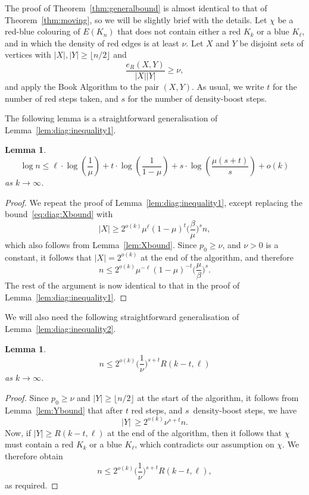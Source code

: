 \documentclass[12pt,reqno]{amsart}
\newtheorem{lemma}[theorem]{Lemma}
\theoremstyle{definition}
\theoremstyle{remark}
\renewcommand{\le}{\leqslant}
\renewcommand{\ge}{\geqslant}
\renewcommand{\to}{\rightarrow}
\begin{document}
The proof of Theorem~\ref{thm:generalbound} is almost identical to that of Theorem~\ref{thm:moving}, so we will be slightly brief with the details. Let $\chi$ be a red-blue colouring of $E(K_n)$ that does not contain either a red $K_k$ or a blue $K_\ell$, and in which the density of red edges is at least $\nu$. Let $X$ and $Y$ be disjoint sets of vertices with $|X|,|Y| \ge \lfloor n/2 \rfloor$ and 
$$\frac{e_R(X,Y)}{|X||Y|} \ge \nu,$$
and apply the Book Algorithm to the pair $(X,Y)$. As usual, we write $t$ for the number of red steps taken, and $s$ for the number of density-boost steps. 
  
The following lemma is a straightforward generalisation of Lemma~\ref{lem:diag:inequality1}.
  
\begin{lemma}\label{lem:offdiag:inequality1}
$$\log n \le \ell \cdot \log \left( \frac{1}{\mu} \right) + t \cdot \log \left(\frac{1}{1-\mu} \right) + s \cdot \log \left(\frac{\mu(s+t)}{s}\right) + o(k)$$
as $k \to \infty$. 
\end{lemma}

\begin{proof}
We repeat the proof of Lemma~\ref{lem:diag:inequality1}, except replacing the bound~\eqref{eq:diag:Xbound} with 
$$|X| \ge 2^{o(k)} \mu^\ell (1 - \mu)^t \bigg( \frac{\beta}{\mu} \bigg)^s n,$$
which also follows from Lemma~\ref{lem:Xbound}. Since $p_0 \ge \nu$, and $\nu > 0$ is a constant, it follows that $|X| = 2^{o(k)}$ at the end of the algorithm, and therefore 
$$n \le 2^{o(k)} \mu^{-\ell} (1 - \mu)^{-t} \bigg( \frac{\mu}{\beta} \bigg)^s.$$
The rest of the argument is now identical to that in the proof of Lemma~\ref{lem:diag:inequality1}.
\end{proof}

We will also need the following straightforward generalisation of Lemma~\ref{lem:diag:inequality2}.

\begin{lemma}\label{lem:offdiag:inequality2} 
$$n \le 2^{o(k)} \bigg( \frac{1}{\nu} \bigg)^{s+t} R(k-t,\ell)$$
as $k \to \infty$.
\end{lemma}

\begin{proof}
Since $p_0 \ge \nu$ and $|Y| \ge \lfloor n/2 \rfloor$ at the start of the algorithm, it follows from Lemma~\ref{lem:Ybound} that after $t$ red steps, and $s$~density-boost steps, we have
$$|Y|  \, \ge 2^{o(k)} \nu^{s + t} n.$$
Now, if $|Y| \ge R(k-t,\ell)$ at the end of the algorithm, then it follows that $\chi$ must contain a red $K_k$ or a blue $K_\ell$, which contradicts our assumption on $\chi$. We therefore obtain 
$$n \le 2^{o(k)} \bigg( \frac{1}{\nu} \bigg)^{s+t} R(k-t,\ell),$$
as required.
\end{proof}
\end{document}

